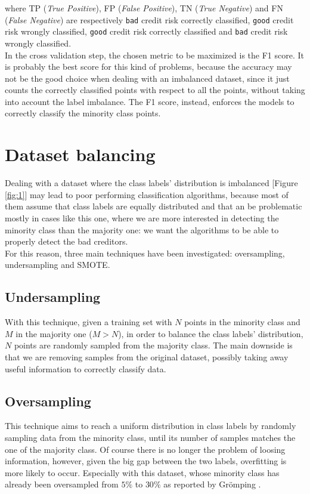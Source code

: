 \documentclass[letterpaper]{article}
\begin{document}
	where TP (\emph{True Positive}), FP (\emph{False Positive}), TN (\emph{True Negative}) and FN (\emph{False Negative}) are respectively \texttt{bad} credit risk correctly classified, \texttt{good} credit risk wrongly classified, \texttt{good} credit risk correctly classified and \texttt{bad} credit risk wrongly classified. \\
	In the cross validation step, the chosen metric to be maximized is the F1 score.
	It is probably the best score for this kind of problems, because the accuracy may not be the good choice when dealing with an imbalanced dataset, since it just counts the correctly classified points with respect to all the points, without taking into account the label imbalance. The F1 score, instead, enforces the models to correctly classify the minority class points.

	\section{Dataset balancing} \label{dataset_balancing}
	Dealing with a dataset where the class labels' distribution is imbalanced [Figure \ref{fig:1}] may lead to poor performing classification algorithms, because most of them assume that class labels are equally distributed and that an be problematic mostly in cases like this one, where we are more interested in detecting the minority class than the majority one: we want the algorithms to be able to properly detect the bad creditors.\\
	For this reason, three main techniques have been investigated: oversampling, undersampling and SMOTE.
	\subsection{Undersampling}
	With this technique, given a training set with $N$ points in the minority class and $M$ in the majority one ($M > N$), in order to balance the class labels' distribution, $N$ points are randomly sampled from the majority class. The main downside is that we are removing samples from the original dataset, possibly taking away useful information to correctly classify data.
	\subsection{Oversampling}
	This technique aims to reach a uniform distribution in class labels by randomly sampling data from the minority class, until its number of samples matches the one of the majority class. Of course there is no longer the problem of loosing information, however, given the big gap between the two labels, overfitting is more likely to occur. Especially with this dataset, whose minority class has already been oversampled from $5\%$ to $30\%$ as reported by Grömping \cite{gromping}.
\end{document}
